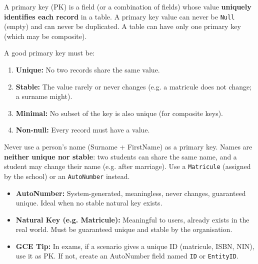 \documentclass[11pt]{article}
\newcommand{\cle}[1]{{\popxbold\color{popdark}#1}}
\newcounter{popsec}
\newcounter{popsub}
\newcommand{\courssub}[1]{%
  \stepcounter{popsub}%
  \par\vspace{9pt}\noindent{\popxbold\fontsize{11.5}{13}\selectfont\color{popink}{\color{poporange}\thepopsec.\thepopsub}\hspace{6pt}#1}\par\nopagebreak\vspace{4pt}
}
\begin{document}
\courssub{Primary Keys}

\begin{definition}
A \cle{primary key} (PK) is a field (or a combination of fields) whose value \textbf{uniquely identifies each record} in a table. A primary key value can never be \texttt{Null} (empty) and can never be duplicated. A table can have only one primary key (which may be composite).
\end{definition}

\begin{propriete}
A good primary key must be:
\begin{enumerate}
    \item \textbf{Unique:} No two records share the same value.
    \item \textbf{Stable:} The value rarely or never changes (e.g. a matricule does not change; a surname might).
    \item \textbf{Minimal:} No subset of the key is also unique (for composite keys).
    \item \textbf{Non-null:} Every record must have a value.
\end{enumerate}
\end{propriete}

\begin{attention}
Never use a person's name (Surname + FirstName) as a primary key. Names are \textbf{neither unique nor stable}: two students can share the same name, and a student may change their name (e.g. after marriage). Use a \texttt{Matricule} (assigned by the school) or an \texttt{AutoNumber} instead.
\end{attention}

\begin{aretenir}
\begin{itemize}
    \item \textbf{AutoNumber:} System-generated, meaningless, never changes, guaranteed unique. Ideal when no stable natural key exists.
    \item \textbf{Natural Key (e.g. Matricule):} Meaningful to users, already exists in the real world. Must be guaranteed unique and stable by the organisation.
    \item \textbf{GCE Tip:} In exams, if a scenario gives a unique ID (matricule, ISBN, NIN), use it as PK. If not, create an AutoNumber field named \texttt{ID} or \texttt{EntityID}.
\end{itemize}
\end{aretenir}
\end{document}
